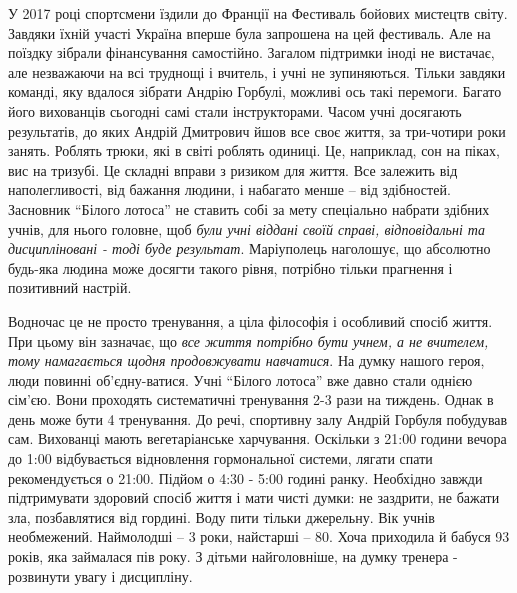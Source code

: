 
У 2017 році спортсмени їздили до Франції на Фестиваль бойових мистецтв світу.
Завдяки їхній участі Україна вперше була запрошена на цей фестиваль. Але на
поїздку зібрали фінансування самостійно. Загалом підтримки іноді не вистачає,
але незважаючи на всі труднощі і вчитель, і учні не зупиняються. Тільки завдяки
команді, яку вдалося зібрати Андрію Горбулі, можливі ось такі перемоги. Багато
його вихованців сьогодні самі стали інструкторами. Часом учні досягають
результатів, до яких Андрій Дмитрович йшов все своє життя, за три-чотири роки
занять. Роблять трюки, які в світі роблять одиниці. Це, наприклад, сон на
піках, вис на тризубі. Це складні вправи з ризиком для життя. Все залежить від
наполегливості, від бажання людини, і набагато менше – від здібностей.
Засновник \enquote{Білого лотоса} не ставить собі за мету спеціально набрати здібних
учнів, для нього головне, щоб \emph{були учні віддані своїй справі, відповідальні та
дисципліновані - тоді буде результат}. Маріуполець наголошує, що абсолютно
будь-яка людина може досягти такого рівня, потрібно тільки прагнення і
позитивний настрій.


Водночас це не просто тренування, а ціла філософія і особливий спосіб життя.
При цьому він зазначає, що \emph{все життя потрібно бути учнем, а не вчителем,
тому намагається щодня продовжувати навчатися}. На думку нашого героя, люди
повинні об'єдну\hyp{}ватися. Учні \enquote{Білого лотоса} вже давно стали однією
сім'єю. Вони проходять систематичні тренування 2-3 рази на тиждень. Однак в
день може бути 4 тренування. До речі, спортивну залу Андрій Горбуля побудував
сам. Вихованці мають вегетаріанське харчування. Оскільки з 21:00 години вечора
до 1:00 відбувається відновлення гормональної системи, лягати спати
рекомендується о 21:00. Підйом о 4:30 - 5:00 годині ранку. Необхідно завжди
підтримувати здоровий спосіб життя і мати чисті думки: не заздрити, не бажати
зла, позбавлятися від гордині. Воду пити тільки джерельну. Вік учнів
необмежений.  Наймолодші – 3 роки, найстарші – 80. Хоча приходила й бабуся 93
років, яка займалася пів року. З дітьми найголовніше, на думку тренера -
розвинути увагу і дисципліну.


